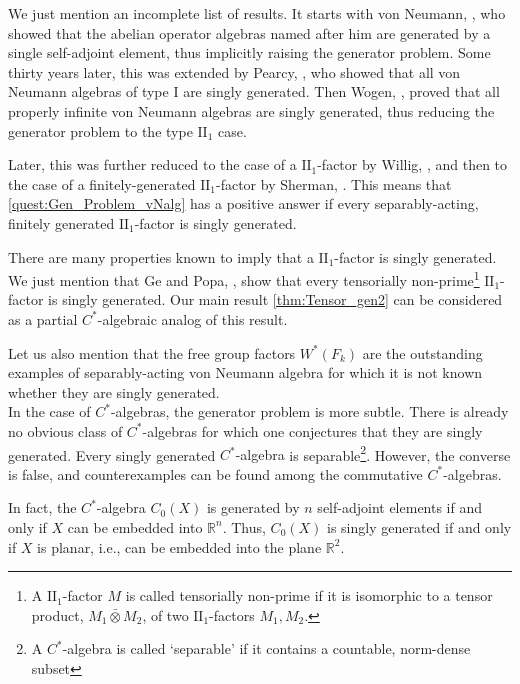 \documentclass{amsart}
\theoremstyle{definition}
\begin{document}
    We just mention an incomplete list of results.
    It starts with von Neumann, \cite{vNe1931}, who showed that the abelian operator algebras named after him are generated by a single self-adjoint element, thus implicitly raising the generator problem.
    Some thirty years later, this was extended by Pearcy, \cite{Pea1962}, who showed that all von Neumann algebras of type $\text{I}$ are singly generated.
    Then Wogen, \cite[Theorem 2]{Wog1969}, proved that all properly infinite von Neumann algebras are singly generated, thus reducing the generator problem to the type $\text{II}_1$ case.

    Later, this was further reduced to the case of a $\text{II}_1$-factor by Willig, \cite{Wil1974}, and then to the case of a finitely-generated $\text{II}_1$-factor by Sherman, \cite[Theorem 3.8]{She2009}.
    This means that \autoref{quest:Gen_Problem_vNalg} has a positive answer if every separably-acting, finitely generated $\text{II}_1$-factor is singly generated.

    There are many properties known to imply that a $\text{II}_1$-factor is singly generated.
    We just mention that Ge and Popa, \cite[Theorem 6.2]{GePop1998}, show that every tensorially
non-prime\footnote{A $\text{II}_1$-factor $M$ is called tensorially non-prime if it is isomorphic to a tensor product, $M_1\bar{\otimes}M_2$, of two $\text{II}_1$-factors $M_1, M_2$.}
    $\text{II}_1$-factor is singly generated.
    Our main result \autoref{thm:Tensor_gen2} can be considered as a partial $C^{*}$-algebraic analog of this result.

    Let us also mention that the free group factors $W^{*}(F_k)$ are the outstanding examples of separably-acting von Neumann algebra for which it is not known whether they are singly generated.
    \\

    In the case of {{$C^*$-al\-ge\-bra}}{s}, the generator problem is more subtle.
    There is already no obvious class of {{$C^*$-al\-ge\-bra}}{s} for which one conjectures that they are singly generated.
    Every singly generated {{$C^*$-al\-ge\-bra}}{} is separable\footnote{A {{$C^*$-al\-ge\-bra}}{} is called `separable' if it contains a countable, norm-dense subset}.
    However, the converse is false, and counterexamples can be found among the commutative {{$C^*$-al\-ge\-bra}}{s}.

    In fact, the {{$C^*$-al\-ge\-bra}}{} $C_{0}(X)$ is generated by $n$ self-adjoint elements if and only if $X$ can be embedded into ${{\mathbb{R}}}^n$.
    Thus, $C_{0}(X)$ is singly generated if and only if $X$ is planar, i.e., can be embedded into the plane ${{\mathbb{R}}}^2$.
\end{document}
